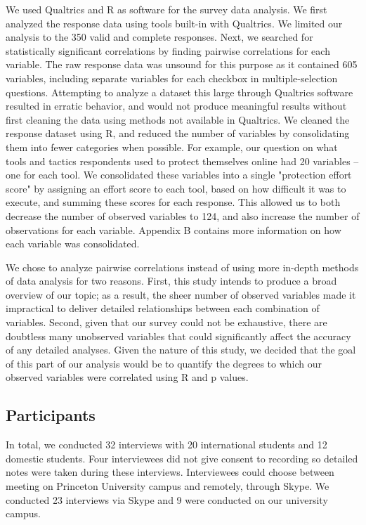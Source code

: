 We used Qualtrics and R as software for the survey data analysis. We first analyzed the
response data using tools built-in with Qualtrics. We limited our analysis to
the 350 valid and complete responses.  Next, we searched for statistically
significant correlations by finding pairwise correlations for each variable.
The raw response data was unsound for this purpose as it contained 605
variables, including separate variables for each checkbox in
multiple-selection questions. Attempting to analyze a dataset this large
through Qualtrics software resulted in erratic behavior, and would not produce
meaningful results without first cleaning the data using methods not available
in Qualtrics. We cleaned the response dataset using R, and reduced the number
of variables by consolidating them into fewer categories when possible. For
example, our question on what tools and tactics respondents used to protect
themselves online had 20 variables -- one for each tool. We consolidated these
variables into a single "protection effort score" by assigning an effort score
to each tool, based on how difficult it was to execute, and summing these
scores for each response. This allowed us to both decrease the number of
observed variables to 124, and also increase the number of observations for
each variable. Appendix B contains more information on how each variable was
consolidated.

We chose to analyze pairwise correlations instead of using more in-depth
methods of data analysis for two reasons. First, this study intends to produce
a broad overview of our topic; as a result, the sheer number of observed
variables made it impractical to deliver detailed relationships between each
combination of variables. Second, given that our survey could not be
exhaustive, there are doubtless many unobserved variables that could
significantly affect the accuracy of any detailed analyses. Given the nature
of this study, we decided that the goal of this part of our analysis would be
to quantify the degrees to which our observed variables were correlated using
R and p values.

\subsection{Participants} In total, we conducted 32 interviews with 20
international students and 12 domestic students. Four interviewees did not give consent to
recording so detailed notes were taken during these interviews. Interviewees
could choose between meeting on Princeton University campus and remotely,
through Skype. We conducted 23 interviews via Skype and 9 were conducted
 on our university campus. 

